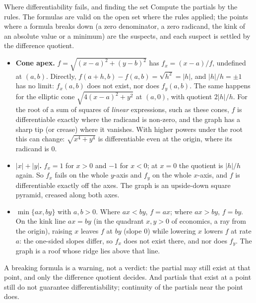 \begin{rulebox}{Where differentiability fails, and finding the set}
Compute the partials by the rules. The formulas are valid on the open set
where the rules applied; the points where a formula breaks down (a zero
denominator, a zero radicand, the kink of an absolute value or a minimum)
are the suspects, and each suspect is settled by the difference quotient.
\begin{itemize}[leftmargin=1.6em,itemsep=0.3ex]
  \item \textbf{Cone apex.} $f=\sqrt{(x-a)^{2}+(y-b)^{2}}$ has
        $f_{x}=(x-a)/f$, undefined at $(a,b)$. Directly,
        $f(a+h,b)-f(a,b)=\sqrt{h^{2}}=|h|$, and $|h|/h=\pm1$ has no limit:
        $f_{x}(a,b)$ does not exist, nor does $f_{y}(a,b)$. The same
        happens for the elliptic cone $\sqrt{4(x-a)^{2}+y^{2}}$ at $(a,0)$,
        with quotient $2|h|/h$. For the root of a sum of squares of
        \emph{linear} expressions, such as these cones, $f$ is
        differentiable exactly where the radicand is non-zero, and the
        graph has a sharp tip (or crease) where it vanishes. With higher
        powers under the root this can change: $\sqrt{x^{4}+y^{4}}$ is
        differentiable even at the origin, where its radicand is $0$.
  \item \textbf{$|x|+|y|$.} $f_{x}=1$ for $x>0$ and $-1$ for $x<0$; at
        $x=0$ the quotient is $|h|/h$ again. So $f_{x}$ fails on the whole
        $y$-axis and $f_{y}$ on the whole $x$-axis, and $f$ is
        differentiable exactly off the axes. The graph is an upside-down
        square pyramid, creased along both axes.
  \item \textbf{$\min\{ax,by\}$} with $a,b>0$. Where $ax<by$, $f=ax$;
        where $ax>by$, $f=by$. On the kink line $ax=by$ (in the quadrant
        $x,y>0$ of economics, a ray from the origin), raising $x$ leaves
        $f$ at $by$ (slope $0$) while lowering $x$ lowers $f$ at rate $a$:
        the one-sided slopes differ, so $f_{x}$ does not exist there, and
        nor does $f_{y}$. The graph is a roof whose ridge lies above that
        line.
\end{itemize}
A breaking formula is a warning, not a verdict: the partial may still
exist at that point, and only the difference quotient decides. And partials
that exist at a point still do not guarantee differentiability; continuity
of the partials near the point does.
\end{rulebox}


